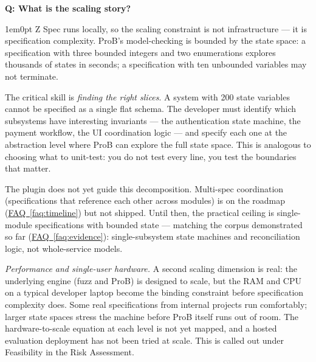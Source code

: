 \documentclass[11pt,letterpaper]{article}
\newcounter{faqnum}
\newenvironment{faqpair}[1]{%
  \needspace{4\baselineskip}%
  \vspace{0.5em}%
  \refstepcounter{faqnum}%
  \noindent\textbf{\color{SectionBlue}Q\thefaqnum: #1}\par\nopagebreak[4]%
  \vspace{0.2em}%
  \begin{adjustwidth}{1em}{0pt}%
  \setlength{\parindent}{0pt}%
}{%
  \end{adjustwidth}%
  \vspace{0.5em}%
}
\newcommand{\faqref}[1]{\hyperref[#1]{FAQ~\ref*{#1}}}
\begin{document}
\begin{faqpair}{What is the scaling story?}\label{faq:scaling}
Z Spec runs locally, so the scaling constraint is not infrastructure --- it is specification complexity. ProB's model-checking is bounded by the state space: a specification with three bounded integers and two enumerations explores thousands of states in seconds; a specification with ten unbounded variables may not terminate.

The critical skill is \emph{finding the right slices}. A system with 200 state variables cannot be specified as a single flat schema. The developer must identify which subsystems have interesting invariants --- the authentication state machine, the payment workflow, the UI coordination logic --- and specify each one at the abstraction level where ProB can explore the full state space. This is analogous to choosing what to unit-test: you do not test every line, you test the boundaries that matter.

The plugin does not yet guide this decomposition. Multi-spec coordination (specifications that reference each other across modules) is on the roadmap (\faqref{faq:timeline}) but not shipped. Until then, the practical ceiling is single-module specifications with bounded state --- matching the corpus demonstrated so far (\faqref{faq:evidence}): single-subsystem state machines and reconciliation logic, not whole-service models.

\emph{Performance and single-user hardware.} A second scaling dimension is real: the underlying engine (fuzz and ProB) is designed to scale, but the RAM and CPU on a typical developer laptop become the binding constraint before specification complexity does. Some real specifications from internal projects run comfortably; larger state spaces stress the machine before ProB itself runs out of room. The hardware-to-scale equation at each level is not yet mapped, and a hosted evaluation deployment has not been tried at scale. This is called out under Feasibility in the Risk Assessment.
\end{faqpair}
\end{document}
